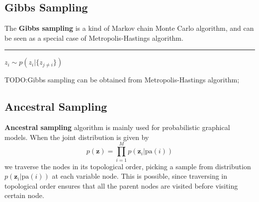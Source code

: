 \documentclass{article}
\begin{document}
    \subsection{Gibbs Sampling}
        The \textbf{Gibbs sampling} is a kind of Markov chain Monte Carlo algorithm, and can be seen as a special case of Metropolis-Hastings algorithm.
        
        \begin{algorithm}[H]
            \DontPrintSemicolon

            \caption{Gibbs sampling algorithm}


            \BlankLine
            \hrule
            
            {
                {
                    $z_i \sim p(z_i|\{z_{j \neq i}\})$\;
                }
            }
            
        \end{algorithm}

        TODO:Gibbs sampling can be obtained from Metropolis-Hastings algorithm;
    \subsection{Ancestral Sampling}
        \textbf{Ancestral sampling} algorithm is mainly used for probabilistic graphical models. When the joint distribution is given by
        \[
        p(\textbf{z})=\prod_{i=1}^{M}p(\textbf{z}_i|\text{pa}(i))
        \]
        we traverse the nodes in its topological order, picking a sample from distribution $p(\textbf{z}_i|\text{pa}(i))$ at each variable node.
        This is possible, since traversing in topological order ensures that all the parent nodes are visited before visiting certain node.
        
\end{document}

